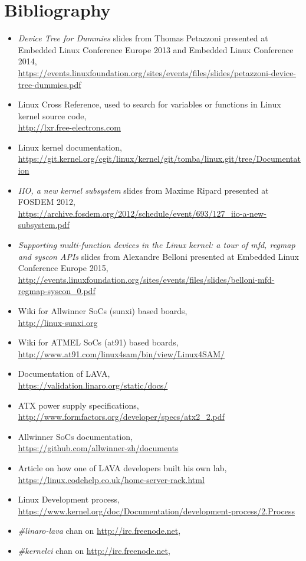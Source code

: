 \chapter*{Bibliography}

\begin{itemize}
  \item \textit{Device Tree for Dummies} slides from Thomas Petazzoni presented at Embedded Linux Conference Europe 2013 and Embedded Linux Conference 2014,\\
\url{https://events.linuxfoundation.org/sites/events/files/slides/petazzoni-device-tree-dummies.pdf}
  \item Linux Cross Reference, used to search for variables or functions in Linux kernel source code,\\
\url{http://lxr.free-electrons.com}
  \item Linux kernel documentation,\\
\url{https://git.kernel.org/cgit/linux/kernel/git/tomba/linux.git/tree/Documentation}
  \item \textit{IIO, a new kernel subsystem} slides from Maxime Ripard presented at FOSDEM 2012,\\
\url{https://archive.fosdem.org/2012/schedule/event/693/127\_iio-a-new-subsystem.pdf}
  \item \textit{Supporting multi-function devices in the Linux kernel: a tour of mfd, regmap and syscon APIs} slides from Alexandre Belloni presented at Embedded Linux Conference Europe 2015,\\
\url{http://events.linuxfoundation.org/sites/events/files/slides/belloni-mfd-regmap-syscon\_0.pdf}
  \item Wiki for Allwinner SoCs (sunxi) based boards,\\
\url{http://linux-sunxi.org}
  \item Wiki for ATMEL SoCs (at91) based boards,\\
\url{http://www.at91.com/linux4sam/bin/view/Linux4SAM/}
  \item Documentation of LAVA,\\
\url{https://validation.linaro.org/static/docs/}
  \item ATX power supply specifications,\\
\url{http://www.formfactors.org/developer/specs/atx2\_2.pdf}
  \item Allwinner SoCs documentation,\\
\url{https://github.com/allwinner-zh/documents}
  \item Article on how one of LAVA developers built his own lab,\\
\url{https://linux.codehelp.co.uk/home-server-rack.html}
  \item Linux Development process,\\
\url{https://www.kernel.org/doc/Documentation/development-process/2.Process}
  \item \textit{\#linaro-lava} chan on \url{http://irc.freenode.net},
  \item \textit{\#kernelci} chan on \url{http://irc.freenode.net},
\end{itemize}
